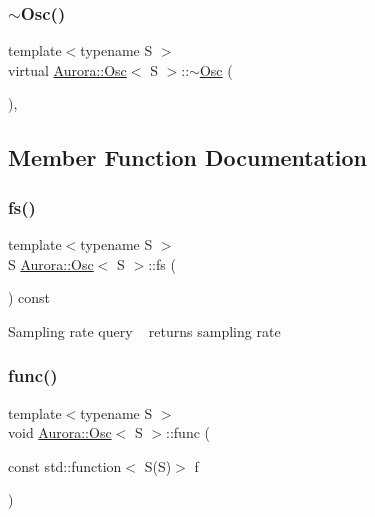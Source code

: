\subsubsection{\texorpdfstring{$\sim$\+Osc()}{~Osc()}}
{\footnotesize\ttfamily template$<$typename S $>$ \\
virtual \hyperlink{class_aurora_1_1_osc}{Aurora\+::\+Osc}$<$ S $>$\+::$\sim$\hyperlink{class_aurora_1_1_osc}{Osc} (\begin{DoxyParamCaption}{ }\end{DoxyParamCaption})\hspace{0.3cm}{\ttfamily [inline]}, {\ttfamily [virtual]}}



\subsection{Member Function Documentation}
\mbox{\label{class_aurora_1_1_osc_a9ac3aa9006fc98588b2163e0e56f6e30}} 
\subsubsection{\texorpdfstring{fs()}{fs()}}
{\footnotesize\ttfamily template$<$typename S $>$ \\
S \hyperlink{class_aurora_1_1_osc}{Aurora\+::\+Osc}$<$ S $>$\+::fs (\begin{DoxyParamCaption}{ }\end{DoxyParamCaption}) const\hspace{0.3cm}{\ttfamily [inline]}}

Sampling rate query ~\newline
returns sampling rate \mbox{\label{class_aurora_1_1_osc_a47029d701edea820aba145788b6f5bb6}} 
\subsubsection{\texorpdfstring{func()}{func()}}
{\footnotesize\ttfamily template$<$typename S $>$ \\
void \hyperlink{class_aurora_1_1_osc}{Aurora\+::\+Osc}$<$ S $>$\+::func (\begin{DoxyParamCaption}\item[{const std\+::function$<$ S(S)$>$}]{f }\end{DoxyParamCaption})\hspace{0.3cm}{\ttfamily [inline]}}

